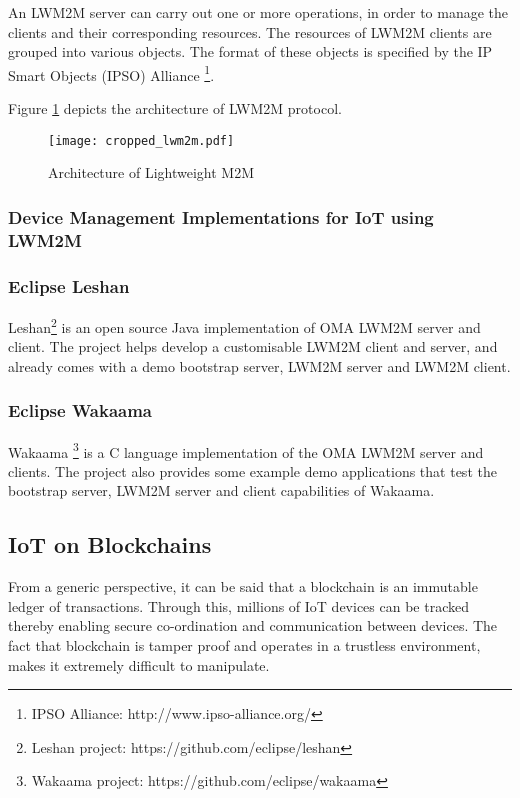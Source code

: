 \documentclass[english]{tktltiki}
\begin{document}
An LWM2M server can carry out one or more operations, in order to manage the clients and their corresponding resources. The resources of LWM2M clients are grouped into various objects. The format of these objects is specified by the IP Smart Objects (IPSO) Alliance \footnote{IPSO Alliance: http://www.ipso-alliance.org/}. 

Figure \ref{lwm2m} depicts the architecture of LWM2M protocol.

\begin{figure}[H]
\begin{center}
\texttt{[image: cropped\_lwm2m.pdf]}
\caption{Architecture of Lightweight M2M}
\label{lwm2m}
\end{center}
\end{figure}

\subsubsection{Device Management Implementations for IoT using LWM2M}
\subsubsection*{Eclipse Leshan}
Leshan\footnote{Leshan project: https://github.com/eclipse/leshan} is an open source Java implementation of OMA LWM2M server and client. The project helps develop a customisable LWM2M client and server, and already comes with a demo bootstrap server, LWM2M server and LWM2M client.  
\subsubsection*{Eclipse Wakaama}
Wakaama \footnote{Wakaama project: https://github.com/eclipse/wakaama} is a C language implementation of the OMA LWM2M server and clients. The project also provides some example demo applications that test the bootstrap server, LWM2M server and client capabilities of Wakaama.

\subsection{IoT on Blockchains}

From a generic perspective, it can be said that a blockchain is an immutable ledger of transactions. Through this, millions of IoT devices can be tracked thereby enabling secure co-ordination and communication between devices. The fact that blockchain is tamper proof and operates in a trustless environment, makes it extremely difficult to manipulate.
\end{document}
